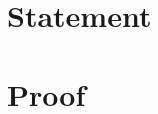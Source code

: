 \documentclass[11pt]{article}
\begin{document}
\section*{Statement}

\section*{Proof}

\end{document}
